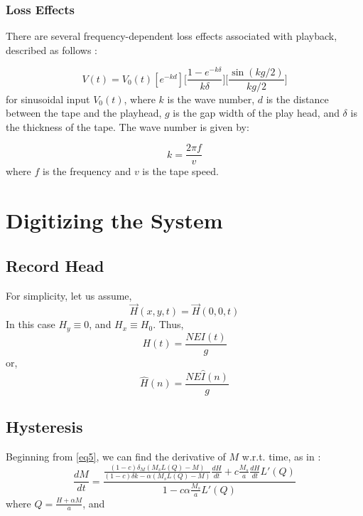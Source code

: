 \documentclass[twoside,a4paper]{article}
\begin{document}
\subsubsection{Loss Effects}
There are several frequency-dependent loss effects associated with playback,
described as follows \cite{Kadis}:

\begin{equation}
    V(t) = V_0(t) [e^{-kd}] \Big[\frac{1 - e^{-k \delta}}{k \delta} \Big] \Big[\frac{\sin (kg /2)}{kg/2} \Big]
    \label{eq:lossEffects}
\end{equation}
%
for sinusoidal input $V_0(t)$, where $k$ is the wave number, $d$ is the distance between the tape and the playhead,
$g$ is the gap width of the play head, and $\delta$ is the thickness of the tape. The wave number
is given by:

\begin{equation}
    k = \frac {2 \pi f}{v}
    \label{eq:wavenumber}
\end{equation}
%
where $f$ is the frequency and $v$ is the tape speed.

\section{Digitizing the System}
\subsection{Record Head}
For simplicity, let us assume,
\begin{equation}
    \vec{H}(x,y,t) = \vec{H}(0,0,t)
    \label{eq:spatialApprox}
\end{equation}
%
In this case $H_y \equiv 0$, and $H_x \equiv H_0$. Thus,
\begin{equation}
    H(t) = \frac{NEI(t)}{g}
    \label{eq15}
\end{equation}
%
or,
\begin{equation}
    \hat{H}(n) = \frac{NE\hat{I}(n)}{g}
    \label{eq:Hin}
\end{equation}

\subsection{Hysteresis}
Beginning from \cref{eq5}, we can find the derivative of $M$ w.r.t. time,
as in \cite{Hysteresis}:
\begin{equation}
    \frac{dM}{dt} = \frac{\frac{(1-c) \delta_M (M_sL(Q) - M)}{(1-c) \delta k - \alpha (M_sL(Q) - M)} \frac{dH}{dt} + c \frac{M_s}{a} \frac{dH}{dt} L'(Q)}{1 - c \alpha \frac{M_s}{a} L'(Q)}
    \label{eq:dmdt}
\end{equation}
%
where $Q = \frac{H + \alpha M}{a}$, and
\end{document}
